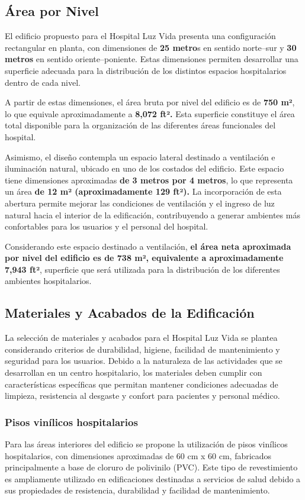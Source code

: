 \documentclass[14pt,letterpaper]{extarticle}
\begin{document}
	\newpage
	
	
	\subsection{Área por Nivel}
	El edificio propuesto para el Hospital Luz Vida presenta una configuración rectangular en planta, con dimensiones de \textbf{25 metro}s en sentido norte–sur y\textbf{ 30 metros} en sentido oriente–poniente. Estas dimensiones permiten desarrollar una superficie adecuada para la distribución de los distintos espacios hospitalarios dentro de cada nivel.
	
	A partir de estas dimensiones, el área bruta por nivel del edificio es de \textbf{750 m²}, lo que equivale aproximadamente a\textbf{ 8,072 ft².} Esta superficie constituye el área total disponible para la organización de las diferentes áreas funcionales del hospital.
	
	Asimismo, el diseño contempla un espacio lateral destinado a ventilación e iluminación natural, ubicado en uno de los costados del edificio. Este espacio tiene dimensiones aproximadas \textbf{de 3 metros por 4 metros}, lo que representa un área \textbf{de 12 m² (aproximadamente 129 ft²).} La incorporación de esta abertura permite mejorar las condiciones de ventilación y el ingreso de luz natural hacia el interior de la edificación, contribuyendo a generar ambientes más confortables para los usuarios y el personal del hospital.
	
	Considerando este espacio destinado a ventilación, \textbf{el área neta aproximada por nivel del edificio es de 738 m², equivalente a aproximadamente 7,943 ft²}, superficie que será utilizada para la distribución de los diferentes ambientes hospitalarios.
	
	\newpage
	
	\subsection{Materiales y Acabados de la Edificación}
	La selección de materiales y acabados para el Hospital Luz Vida se plantea considerando criterios de durabilidad, higiene, facilidad de mantenimiento y seguridad para los usuarios. Debido a la naturaleza de las actividades que se desarrollan en un centro hospitalario, los materiales deben cumplir con características específicas que permitan mantener condiciones adecuadas de limpieza, resistencia al desgaste y confort para pacientes y personal médico.
	
		\subsubsection{Pisos vinílicos hospitalarios}
		Para las áreas interiores del edificio se propone la utilización de pisos vinílicos hospitalarios, con dimensiones aproximadas de 60 cm x 60 cm, fabricados principalmente a base de cloruro de polivinilo (PVC). Este tipo de revestimiento es ampliamente utilizado en edificaciones destinadas a servicios de salud debido a sus propiedades de resistencia, durabilidad y facilidad de mantenimiento.
		
\end{document}
